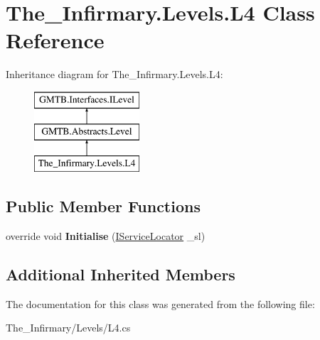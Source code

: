 \hypertarget{class_the___infirmary_1_1_levels_1_1_l4}{}\section{The\+\_\+\+Infirmary.\+Levels.\+L4 Class Reference}
\label{class_the___infirmary_1_1_levels_1_1_l4}
Inheritance diagram for The\+\_\+\+Infirmary.\+Levels.\+L4\+:\begin{figure}[H]
\begin{center}
\leavevmode
\includegraphics[height=3.000000cm]{class_the___infirmary_1_1_levels_1_1_l4}
\end{center}
\end{figure}
\subsection*{Public Member Functions}
\begin{DoxyCompactItemize}
\item 
\mbox{\label{class_the___infirmary_1_1_levels_1_1_l4_a50a15955ce03ea614a3fcc32df4672de}} 
override void {\bfseries Initialise} (\mbox{\hyperlink{interface_g_m_t_b_1_1_interfaces_1_1_i_service_locator}{I\+Service\+Locator}} \+\_\+sl)
\end{DoxyCompactItemize}
\subsection*{Additional Inherited Members}


The documentation for this class was generated from the following file\+:\begin{DoxyCompactItemize}
\item 
The\+\_\+\+Infirmary/\+Levels/L4.\+cs\end{DoxyCompactItemize}
